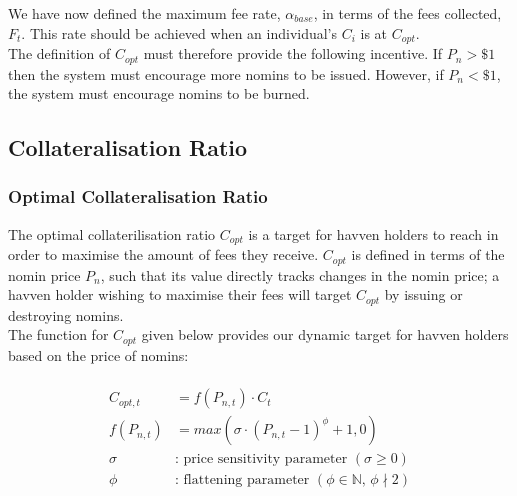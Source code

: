 \noindent We have now defined the maximum fee rate, $\alpha_{base}$, in terms of the fees collected, $F_t$. This rate should be achieved when an individual's $C_i$ is at $C_{opt}$. \\

\noindent The definition of $C_{opt}$ must therefore provide the following incentive. If $P_n > \$1$ then the system must encourage more nomins to be issued. However, if $P_n < \$1$, the system must encourage nomins to be burned. 

\newpage

\subsection{Collateralisation Ratio}
\subsubsection{Optimal Collateralisation Ratio}

\noindent The optimal collaterilisation ratio $C_{opt}$ is a target for havven
holders to reach in order to maximise the amount of fees they receive.
$C_{opt}$ is defined in terms of the nomin price $P_n$, such that its value directly tracks changes in the nomin price; a havven
holder wishing to maximise their fees will target $C_{opt}$ by issuing or destroying nomins. \\

\noindent The function for $C_{opt}$ given below provides our dynamic target
for havven holders based on the price of nomins:

\begin{gather} \label{eq:optcollateralisation}
\begin{align}
\begin{split}
C_{opt,t} &= f(P_{n,t}) \cdot C_t  \\ 
f(P_{n,t}) &= max(\sigma \cdot (P_{n,t} - 1)^{\phi} + 1, 0) \\
\sigma & \text{: price sensitivity parameter } (\sigma \geq 0)\\
\phi   & \text{: flattening parameter } (\phi \in \mathbb{N} \text{, } \phi \nmid 2) \\
\end{split}
\end{align}
\end{gather}


\begin{center}
\end{center}

